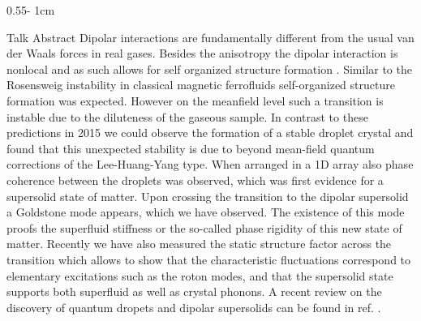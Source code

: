 \documentclass{../psuposter}
\begin{document}
\begin{frame}
\begin{columns}[t, totalwidth=\textwidth]
\begin{column}{0.55\textwidth - 1cm}
    \begin{block}{Talk Abstract}
         Dipolar interactions are fundamentally different from the usual van der Waals forces in real gases. Besides the anisotropy the dipolar interaction is nonlocal and as such allows for self organized structure formation \cite{lahayePhysicsDipolarBosonic2009a}. Similar to the Rosensweig instability in classical magnetic ferrofluids self-organized structure formation was expected. However on the meanfield level such a transition is instable due to the diluteness of the gaseous sample. In contrast to these predictions in 2015 we could observe the formation of a stable droplet crystal and found that this unexpected stability is due to beyond mean-field quantum corrections of the Lee-Huang-Yang type. When arranged in a 1D array also phase coherence between the droplets was observed, which was first evidence for a supersolid state of matter. Upon crossing the transition to the dipolar supersolid a Goldstone mode appears, which we have observed. The existence of this mode proofs the superfluid stiffness or the so-called phase rigidity of this new state of matter. Recently we have also measured the static structure factor across the transition which allows to show that the characteristic fluctuations correspond to elementary excitations such as the roton modes, and that the supersolid state supports both superfluid as well as crystal phonons. A recent review on the discovery of quantum dropets and dipolar supersolids can be found in ref. \cite{bottcherTransientSupersolidProperties2019a}.
    \end{block}



\end{column}
\end{columns}
\end{frame}
\end{document}
